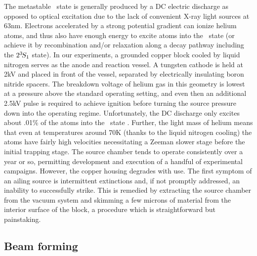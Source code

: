 	The metastable \mhe~state is generally produced by a DC electric discharge as opposed to optical excitation due to the lack of convenient X-ray light sources at 63nm.
	Electrons accelerated by a strong potential gradient can ionize helium atoms, and thus also have enough energy to excite atoms into the \mhe~state (or achieve it by recombination and/or relaxation along a decay pathway including the $2^{3\!}S_1$ state).
	In our experiments, a grounded copper block cooled by liquid nitrogen serves as the anode and reaction vessel.
	A tungsten cathode is held at 2kV and placed in front of the vessel, separated by electrically insulating boron nitride spacers.
	The breakdown voltage of helium gas in this geometry is lowest at a pressure above the standard operating setting, and even then an additional 2.5kV pulse is required to achieve ignition before turning the source pressure down into the operating regime.
	Unfortunately, the DC discharge only excites about .01\% of the atoms into the \mhe~state \cite{Stas06}.
	Further, the light mass of helium means that even at temperatures around 70K (thanks to the liquid nitrogen cooling) the atoms have fairly high velocities necessitating a Zeeman slower stage before the initial trapping stage. 
	The source chamber tends to operate consistently over a year or so, permitting development and execution of a handful of experimental campaigns.
	However, the copper housing degrades with use.
	The first symptom of an ailing source is intermittent extinctions and, if not promptly addressed, an inability to successfully strike.
	This is remedied by extracting the source chamber from the vacuum system and skimming a few microns of material from the interior surface of the block, a procedure which is  straightforward but painstaking.
	

\subsection*{Beam forming}

